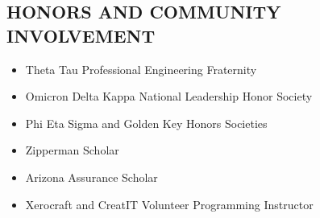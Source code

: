 \documentclass{res}
\begin{document}
\begin{resume}
\section{HONORS AND COMMUNITY INVOLVEMENT}
  \begin{itemize} \itemsep -2pt %
    \item Theta Tau Professional Engineering Fraternity
    \item Omicron Delta Kappa National Leadership Honor Society
    \item Phi Eta Sigma and Golden Key Honors Societies
    \item Zipperman Scholar
    \item Arizona Assurance Scholar
    \item Xerocraft and CreatIT Volunteer Programming Instructor
  \end{itemize}


\end{resume}
\end{document}
